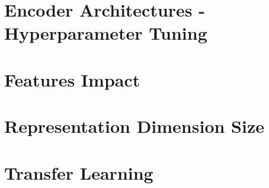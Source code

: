 \documentclass[12pt]{report} %
\begin{document}
\section{Encoder Architectures - Hyperparameter Tuning}
\section{Features Impact}
\section{Representation Dimension Size}


\section{Transfer Learning}




 
%	 	
%	
   

   
\end{document}

